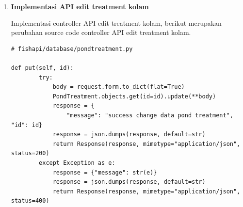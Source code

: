 \begin{enumerate}[1.]
Berikut merupakan hasil test request dari API fetch list treatment kolam.

cURL:

\begin{lstlisting}
curl --location 'http://jft.web.id/fishapi/api/pondtreatment'
\end{lstlisting}

response json:

\begin{lstlisting}
[
  {
    "_id": "62f5248cae2842f914ee7797",
    "pond_id": "62a62163e445ffb9c5f746f3",
    "pond_activation_id": "62d3f2180d7265ab60f9cb83",
    "treatment_type": "ringan",
    "probiotic_culture": 10,
    "carbohydrate": 10,
    "carbohydrate_type": "gula",
    "pond": {
      "_id": "62a62163e445ffb9c5f746f3",
      "alias": "charlie",
      "location": "blok 2",
      "build_at": "2022-06-13 00:24:51.473000",
      "isActive": false
    },
    "pond_activation": {
      "_id": "62d3f2180d7265ab60f9cb83",
      "isFinish": true,
      "isWaterPreparation": true,
      "water_level": 100,
      "activated_at": "2022-07-17 18:27:20.511000"
    }
  },
  {
    "_id": "62f52c34307b0c2008380309",
    "pond_id": "62a62163e445ffb9c5f746f3",
    "pond_activation_id": "62d3f2180d7265ab60f9cb83",
    "treatment_type": "karantina",
    "carbohydrate_type": "",
    "description": "penyakit ikan sekolam",
    "pond": {
      "_id": "62a62163e445ffb9c5f746f3",
      "alias": "charlie",
      "location": "blok 2",
      "build_at": "2022-06-13 00:24:51.473000",
      "isActive": false
    },
    "pond_activation": {
      "_id": "62d3f2180d7265ab60f9cb83",
      "isFinish": true,
      "isWaterPreparation": true,
      "water_level": 100,
      "activated_at": "2022-07-17 18:27:20.511000"
    }
  }
]
\end{lstlisting}



\item \textbf{Implementasi API edit treatment kolam}

Implementasi controller API edit treatment kolam, berikut merupakan perubahan source code controller API edit treatment kolam.

\begin{lstlisting}
# fishapi/database/pondtreatment.py

def put(self, id):
        try:
            body = request.form.to_dict(flat=True)
            PondTreatment.objects.get(id=id).update(**body)
            response = {
                "message": "success change data pond treatment", "id": id}
            response = json.dumps(response, default=str)
            return Response(response, mimetype="application/json", status=200)
        except Exception as e:
            response = {"message": str(e)}
            response = json.dumps(response, default=str)
            return Response(response, mimetype="application/json", status=400)
\end{lstlisting}


\end{enumerate}

